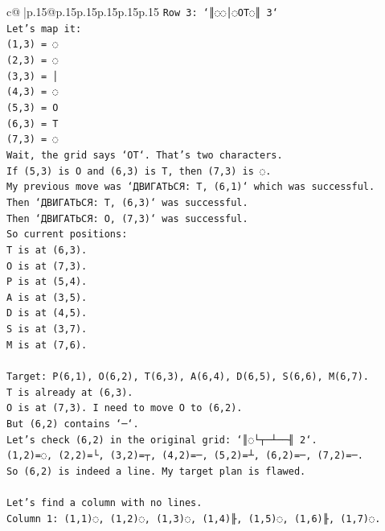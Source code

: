 \documentclass{article}
\begin{document}
{\begin{supertabular}{c@{$\;$}|p{.15\linewidth}@{}p{.15\linewidth}p{.15\linewidth}p{.15\linewidth}p{.15\linewidth}p{.15\linewidth}}
{{{\texttt{Row 3: `║◌◌│◌OT◌║ 3`} \\
\texttt{Let's map it:} \\
\texttt{(1,3) = ◌} \\
\texttt{(2,3) = ◌} \\
\texttt{(3,3) = │} \\
\texttt{(4,3) = ◌} \\
\texttt{(5,3) = O} \\
\texttt{(6,3) = T} \\
\texttt{(7,3) = ◌} \\
\texttt{Wait, the grid says `OT`. That's two characters.} \\
\texttt{If (5,3) is O and (6,3) is T, then (7,3) is ◌.} \\
\texttt{My previous move was `ДВИГАТЬСЯ: T, (6,1)` which was successful.} \\
\texttt{Then `ДВИГАТЬСЯ: T, (6,3)` was successful.} \\
\texttt{Then `ДВИГАТЬСЯ: O, (7,3)` was successful.} \\
\texttt{So current positions:} \\
\texttt{T is at (6,3).} \\
\texttt{O is at (7,3).} \\
\texttt{P is at (5,4).} \\
\texttt{A is at (3,5).} \\
\texttt{D is at (4,5).} \\
\texttt{S is at (3,7).} \\
\texttt{M is at (7,6).} \\
\\ 
\texttt{Target: P(6,1), O(6,2), T(6,3), A(6,4), D(6,5), S(6,6), M(6,7).} \\
\texttt{T is already at (6,3).} \\
\texttt{O is at (7,3). I need to move O to (6,2).} \\
\texttt{But (6,2) contains `─`.} \\
\texttt{Let's check (6,2) in the original grid: `║◌└┬─┴──╢ 2`.} \\
\texttt{(1,2)=◌, (2,2)=└, (3,2)=┬, (4,2)=─, (5,2)=┴, (6,2)=─, (7,2)=─.} \\
\texttt{So (6,2) is indeed a line. My target plan is flawed.} \\
\\ 
\texttt{Let's find a column with no lines.} \\
\texttt{Column 1: (1,1)◌, (1,2)◌, (1,3)◌, (1,4)╟, (1,5)◌, (1,6)╟, (1,7)◌.} \\
}}}
\end{supertabular}}
\end{document}
